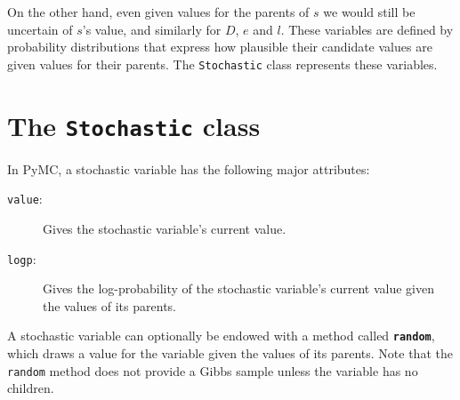 On the other hand, even given values for the parents of $s$ we would still be uncertain of $s$'s value, and similarly for $D$, $e$ and $l$. These variables are defined by probability distributions that express how plausible their candidate values are given values for their parents. The \texttt{Stochastic} class represents these variables.
 

\section{The \texttt{Stochastic} class}

In PyMC, a stochastic variable has the following major attributes: 
\begin{description}
    \item[\texttt{value}:] Gives the stochastic variable's current value.
    \item[\texttt{logp}:] Gives the log-probability of the stochastic variable's current value given the values of its parents.
\end{description}
A stochastic variable can optionally be endowed with a method called \texttt{\bfseries random}, which draws a value for the variable given the values of its parents. Note that the \texttt{random} method does not provide a Gibbs sample unless the variable has no children.

